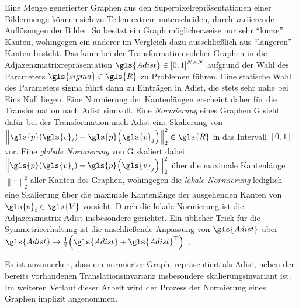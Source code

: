 Eine Menge generierter Graphen aus den Superpixelrepräsentationen einer Bildermenge können sich zu Teilen extrem unterscheiden, \bspw{} durch variierende Auflösungen der Bilder.
So besitzt ein Graph möglicherweise nur sehr \enquote{kurze} Kanten, wohingegen ein anderer im Vergleich dazu ausschließlich aus \enquote{längeren} Kanten besteht.
Das kann bei der Transformation solcher Graphen in die Adjazenzmatrixrepräsentation $\gls{Adist} \in {\left[0, 1\right]}^{N \times N}$ aufgrund der Wahl des Parameters $\gls{sigma} \in \gls{R}$ zu Problemen führen.
Eine statische Wahl des Parameters \gls{sigma} führt dann \ggf{} zu Einträgen in \gls{Adist}, die stets sehr nahe bei Eins \bzw{} Null liegen.
Eine Normierung der Kantenlängen erscheint daher für die Transformation nach \gls{Adist} sinnvoll.
Eine \emph{Normierung} eines Graphen \gls{G} sieht dafür bei der Transformation nach \gls{Adist} eine Skalierung von ${\left\|\gls{p}\left(\gls{v}_i\right) - \gls{p}\left(\gls{v}_j\right)\right\|}_2^2 \in \gls{R}$ in das Intervall $\left[0, 1\right]$ vor.
Eine \emph{globale Normierung} von \gls{G} skaliert dabei ${\left\|\gls{p}\left(\gls{v}_i\right) - \gls{p}\left(\gls{v}_j\right)\right\|}_2^2$ über die maximale Kantenlänge ${\left\|\cdot\right\|}_2^2$ aller Kanten des Graphen, wohingegen die \emph{lokale Normierung} lediglich eine Skalierung über die maximale Kantenlänge der ausgehenden Kanten von $\gls{v}_i \in \gls{V}$ vorsieht.
Durch die lokale Normierung ist die Adjazenzmatrix \gls{Adist} insbesondere gerichtet.
Ein üblicher Trick für die Symmetrieerhaltung ist die anschließende Anpassung von $\gls{Adist}$ über $\gls{Adist} \rightarrow \frac{1}{2}\left(\gls{Adist} + \gls{Adist}^{\top}\right)$~\cite{Reuter}.

Es ist anzumerken, dass ein normierter Graph, repräsentiert als \gls{Adist}, neben der bereits vorhandenen Translationsinvarianz insbesondere skalierungsinvariant ist.
Im weiteren Verlauf dieser Arbeit wird der Prozess der Normierung eines Graphen implizit angenommen.
